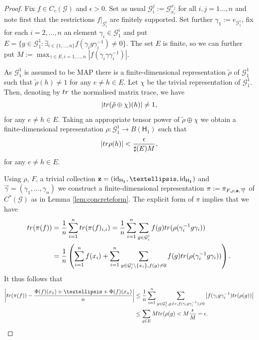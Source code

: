 \documentclass[11 pt, leqno, hidelinks]{amsart}%
\theoremstyle{plain}
\numberwithin{equation}{section}
\newcommand{\GG}{\mathcal{G}}
\newcommand{\tr}{\textup{tr}}
\newcommand{\id}[0]{\operatorname{id}}
\newcommand{\Hil}{\mathsf{H}}
\begin{document}
\begin{proof} Fix $f \in  C_c(\GG)$ and $\epsilon>0$. Set as usual $\GG_i^j:= \GG_{x_i}^{x_j}$ for all $i,j=1\ldots, n$ and note first that the restrictions $f|_{\GG_i^i}$ are finitely supported. Set further $\gamma_1:=e_{\GG_1^1}$, fix for each $i=2,\ldots,n$ an element $\gamma_i\in \GG_1^i $ and put $E=\{g \in \GG_1^1: \exists_{i\in \{1,\ldots,n\}} f(\gamma_ig\gamma_i^{-1}) \neq 0\}$. The set $E$ is finite, so we can further put $M:=\max_{\gamma \in E, i=1,\ldots,n} |f(\gamma_i\gamma\gamma^{-1}_i)|$.

As $\GG_1^1$ is assumed to be MAP
there is a finite-dimensional representation $\tilde{\rho}$ of $\GG_1^1$ such that
	$\tilde{\rho}(h) \neq 1$ for any $e\neq h\in E$. Let $\chi$ be the trivial representation of $\GG_1^1$. Then, denoting by $\tr$ the normalised matrix trace, we have
	$$|\tr (\tilde{\rho}\oplus \chi)(h)|\neq 1,$$ for any $e\neq h\in E$. Taking an appropriate tensor power of $\tilde{\rho}\oplus \chi$ we obtain a finite-dimensional representation $\rho: \GG_1^1\to B(\Hil_1)$ such that $$|\tr  \rho(h)|<\frac{\epsilon}{\sharp(E)M},$$ for any $e\neq h\in E$.
	
	
	Using $\rho$, $F$, a trivial collection $\bf{z}=(\id_{\Hil_1}, \ldots,\id_{\Hil_1})$  and $\overrightarrow{\gamma}=(\gamma_1, \ldots, \gamma_n)$ we construct a finite-dimensional representation $\pi:=\pi_{F, \rho, \bf{z}, \overrightarrow{\gamma}}$ of $C^*(\GG)$ as in Lemma \ref{lem:concreteform}. The explicit form of $\pi$ implies that we have	
\begin{align*}\tr (\pi(f)) &= \frac{1}{n}\sum_{i=1}^n \tr (\pi(f)_{i,i}) =
\frac{1}{n} \sum_{i=1}^n  \sum_{g \in \GG_i^i} f(g) \tr (\rho (\gamma_{i}^{-1}g \gamma_{i}))
\\&= \frac{1}{n} \left( \sum_{i=1}^n f(x_i) + \sum_{i=1}^n  \sum_{g \in \GG_i^i\setminus\{x_i\}, f(g)\neq 0}  f(g) \tr (\rho (\gamma_{i}^{-1}g \gamma_{i})) \right).
\end{align*}
It thus follows that
\begin{align*}
\left|\tr (\pi(f)) - \frac{\Phi(f)(x_1)+\ldots +\Phi(f)(x_n)}{n} \right| &\leq \frac{1}{n}
 \sum_{i=1}^n  \sum_{g \in \GG_1^1, g \neq e, f(\gamma_ig\gamma_i^{-1})\neq 0}  \left|f(\gamma_i g \gamma_i^{-1}) \tr (\rho (g))\right| \\&\leq \sum_{g \in E} M \tr (\rho(g)<  M \frac{\epsilon}{M}= \epsilon.
\end{align*}	

\end{proof}
\end{document}
